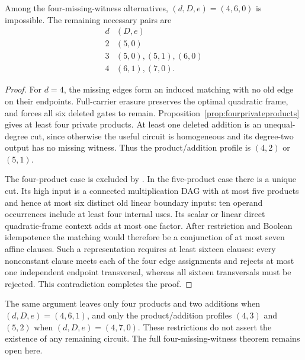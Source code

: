 \begin{corollary}
Among the four-missing-witness alternatives, $(d,D,e)=(4,6,0)$ is impossible. The remaining necessary pairs are
\[
\begin{array}{c|l}
d&(D,e)\\\hline
2&(5,0)\\
3&(5,0),(5,1),(6,0)\\
4&(6,1),(7,0).
\end{array}
\]
\end{corollary}
\begin{proof}
For $d=4$, the missing edges form an induced matching with no old edge on their endpoints. Full-carrier erasure preserves the optimal quadratic frame, and \citet[Lemma~5.33]{Companion} forces all six deleted gates to remain. Proposition~\ref{prop:fourprivateproducts} gives at least four private products. At least one deleted addition is an unequal-degree cut, since otherwise the useful circuit is homogeneous and its degree-two output has no missing witness. Thus the product/addition profile is $(4,2)$ or $(5,1)$.

The four-product case is excluded by \citet[Lemma~5.35]{Companion}. In the five-product case there is a unique cut. Its high input is a connected multiplication DAG with at most five products and hence at most six distinct old linear boundary inputs: ten operand occurrences include at least four internal uses. Its scalar or linear direct quadratic-frame context adds at most one factor. After restriction and Boolean idempotence the matching would therefore be a conjunction of at most seven affine clauses.
Such a representation requires at least sixteen clauses: every nonconstant clause meets each of the four edge assignments and rejects at most one independent endpoint transversal, whereas all sixteen transversals must be rejected. This contradiction completes the proof.
\end{proof}

The same argument leaves only four products and two additions when $(d,D,e)=(4,6,1)$, and only the product/addition profiles $(4,3)$ and $(5,2)$ when $(d,D,e)=(4,7,0)$. These restrictions do not assert the existence of any remaining circuit. The full four-missing-witness theorem remains open here.

